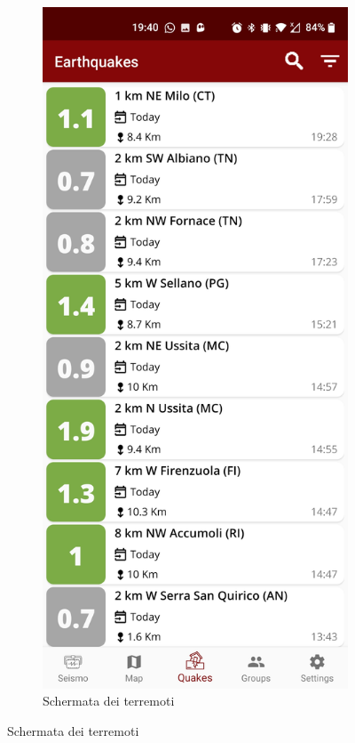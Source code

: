\begin{figure}[h]

\begin{subfigure}{0.5\textwidth}
\includegraphics[width=0.9\linewidth]{images/application.png} 
\caption{Schermata dei terremoti}

\end{subfigure}
\end{figure}
